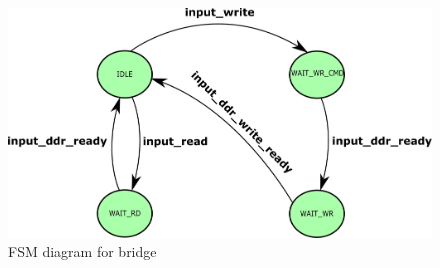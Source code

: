 \begin{figure}
\centering
\includegraphics[width=\columnwidth]{Figures/bridgeFSM.pdf}
\caption{FSM diagram for bridge} \label{fig:bridge}
\end{figure}
